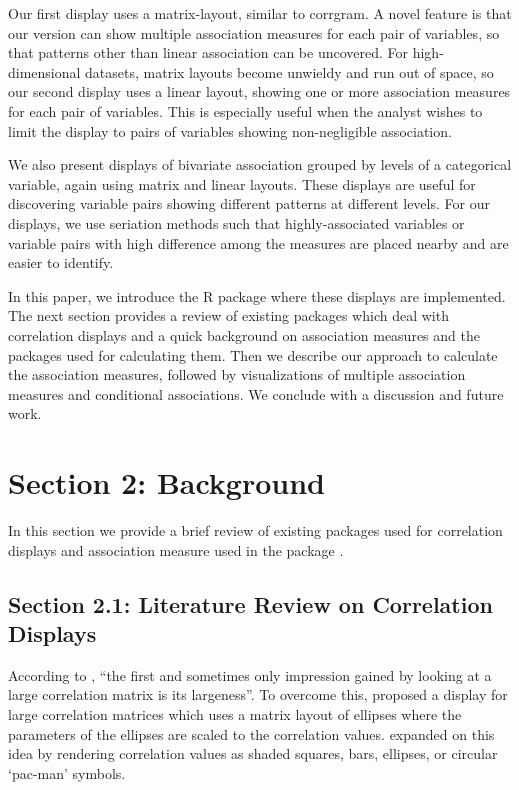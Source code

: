 Our first display uses a matrix-layout, similar to corrgram. A novel
feature is that our version can show multiple association measures for
each pair of variables, so that patterns other than linear association
can be uncovered. For high-dimensional datasets, matrix layouts become
unwieldy and run out of space, so our second display uses a linear
layout, showing one or more association measures for each pair of
variables. This is especially useful when the analyst wishes to limit
the display to pairs of variables showing non-negligible association.

We also present displays of bivariate association grouped by levels of a
categorical variable, again using matrix and linear layouts. These
displays are useful for discovering variable pairs showing different
patterns at different levels. For our displays, we use seriation methods
such that highly-associated variables or variable pairs with high
difference among the measures are placed nearby and are easier to
identify.

In this paper, we introduce the R package  where these
displays are implemented. The next section provides a review of existing
packages which deal with correlation displays and a quick background on
association measures and the packages used for calculating them. Then we
describe our approach to calculate the association measures, followed by
visualizations of multiple association measures and conditional
associations. We conclude with a discussion and future work.

\hypertarget{section-2-background}{%
\section{Section 2: Background}\label{section-2-background}}

In this section we provide a brief review of existing packages used for
correlation displays and association measure used in the package
.

\hypertarget{section-2.1-literature-review-on-correlation-displays}{%
\subsection{Section 2.1: Literature Review on Correlation
Displays}\label{section-2.1-literature-review-on-correlation-displays}}

According to \citet{hills1969looking}, ``the first and sometimes only
impression gained by looking at a large correlation matrix is its
largeness''. To overcome this, \citet{murdoch1996graphical} proposed a
display for large correlation matrices which uses a matrix layout of
ellipses where the parameters of the ellipses are scaled to the
correlation values. \citet{friendly2002corrgrams} expanded on this idea
by rendering correlation values as shaded squares, bars, ellipses, or
circular `pac-man' symbols.

